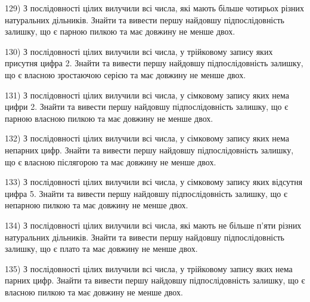 \documentclass[11pt, ukrainian]{article}
\begin{document}
\par
\vspace{0.9cm}
129) \space 
З послідовності цілих вилучили всі числа, які мають більше чотирьох різних натуральних дільників. Знайти та вивести першу найдовшу підпослідовність залишку, що є парною пилкою та має довжину не менше двох.

\par
\vspace{0.9cm}
130) \space 
З послідовності цілих вилучили всі числа, у трійковому запису яких присутня цифра 2. Знайти та вивести першу найдовшу підпослідовність залишку, що є власною зростаючою серією та має довжину не менше двох.

\par
\vspace{0.9cm}
131) \space 
З послідовності цілих вилучили всі числа, у сімковому запису яких нема цифри 2. Знайти та вивести першу найдовшу підпослідовність залишку, що є парною власною пилкою та має довжину не менше двох.

\par
\vspace{0.9cm}
132) \space 
З послідовності цілих вилучили всі числа, у сімковому запису яких нема непарних цифр. Знайти та вивести першу найдовшу підпослідовність залишку, що є власною післягорою та має довжину не менше двох.

\par
\vspace{0.9cm}
133) \space 
З послідовності цілих вилучили всі числа, у сімковому запису яких відсутня цифра 5. Знайти та вивести першу найдовшу підпослідовність залишку, що є непарною пилкою та має довжину не менше двох.

\par
\vspace{0.9cm}
134) \space 
З послідовності цілих вилучили всі числа, які мають не більше п'яти різних натуральних дільників. Знайти та вивести першу найдовшу підпослідовність залишку, що є плато та має довжину не менше двох.

\par
\vspace{0.9cm}
135) \space 
З послідовності цілих вилучили всі числа, у трійковому запису яких нема парних цифр. Знайти та вивести першу найдовшу підпослідовність залишку, що є власною пилкою та має довжину не менше двох.
\end{document}
